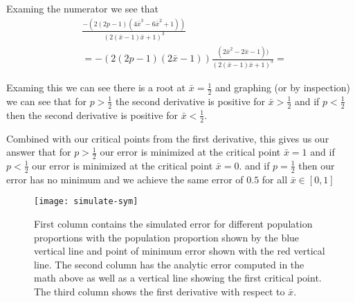 Examing the numerator we see that
\begin{align*}
	&\frac{-(2(2p-1)(4\bar{x}^3-6\bar{x}^2+1))}{(2(\bar{x}-1)\bar{x}+1)^3} \\
	&=-(2(2p-1)(2\bar{x}-1))\frac{(2\bar{x}^2-2\bar{x}-1))}{(2(\bar{x}-1)\bar{x}+1)^3}=
\end{align*} 

Examing this we can see there is a root at $\bar{x} = \frac{1}{2}$ and graphing (or by inspection) we can see that 
for $p > \frac{1}{2}$ the second derivative is positive for $\bar{x} > \frac{1}{2}$ and if $p < \frac{1}{2}$ then the second derivative is positive for $\bar{x} < \frac{1}{2}$.

Combined with our critical points from the first derivative, this gives us our answer that for $p >  \frac{1}{2}$ our error is minimized at the critical point $\bar{x} = 1$ and if $p < \frac{1}{2}$ our error is minimized at the critical point $\bar{x} = 0$. and if  $p = \frac{1}{2}$ then our error has no minimum and we achieve the same error of $0.5$ for all $\bar{x} \in [0,1]$

\begin{figure}[ht!]
  \centering
	\texttt{[image: simulate-sym]}
	\caption{First column contains the simulated error for different population proportions with the population proportion shown by the blue vertical line and point of minimum error shown with the red vertical line. The second column has the analytic error computed in the math above as well as a vertical line showing the first critical point. The third column shows the first derivative with respect to $\bar{x}$.} 
\end{figure}







